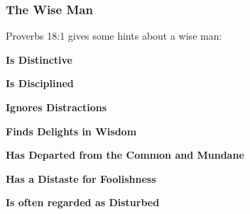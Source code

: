 \subsubsection{The Wise Man}
Proverbs 18:1 gives some hints about a wise man:
\begin{compactenum}[I.]
    \item \textbf{Is Distinctive}
    \item \textbf{Is Disciplined}
    \item \textbf{Ignores Distractions}
    \item \textbf{Finds Delights in Wisdom}
    \item \textbf{Has Departed from the Common and Mundane}
    \item \textbf{Has a Distaste for Foolishness}
    \item \textbf{Is often regarded as Disturbed}
\end{compactenum}

